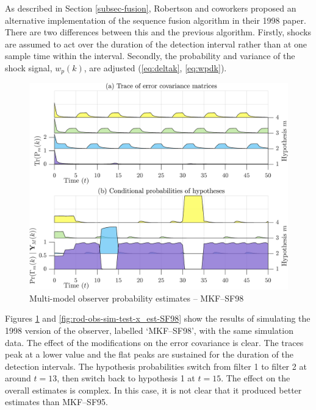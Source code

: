 As described in Section \ref{subsec-fusion}, Robertson and coworkers proposed an alternative implementation of the sequence fusion algorithm in their 1998 paper. There are two differences between this and the previous algorithm. Firstly, shocks are assumed to act over the duration of the detection interval rather than at one sample time within the interval. Secondly, the probability and variance of the shock signal, $w_{p}(k)$, are adjusted (\ref{eq:deltak}, \ref{eq:wpdk}).

\begin{figure}[htp]
	\centering
	\includegraphics[width=12cm]{images/rod_MKF_test_sim_MKF_SF98_prob.png}
	\caption{Multi-model observer probability estimates – MKF--SF98}
	\label{fig:rod-obs-sim-test-probs-SF98}
\end{figure}
Figures \ref{fig:rod-obs-sim-test-probs-SF98} and \ref{fig:rod-obs-sim-test-x_est-SF98} show the results of simulating the 1998 version of the observer, labelled `MKF--SF98', with the same simulation data. The effect of the modifications on the error covariance is clear. The traces peak at a lower value and the flat peaks are sustained for the duration of the detection intervals. The hypothesis probabilities switch from filter 1 to filter 2 at around $t=13$, then switch back to hypothesis 1 at $t=15$. The effect on the overall estimates is complex. In this case, it is not clear that it produced better estimates than MKF--SF95.
